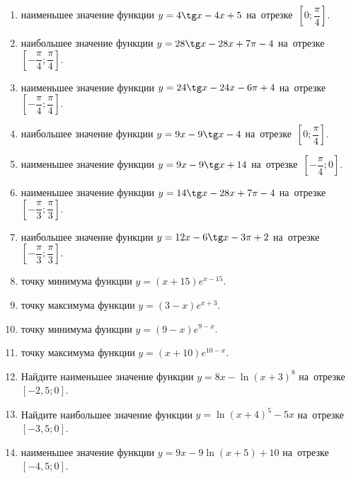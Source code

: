 \documentclass[a4paper,10pt]{article}
\begin{document}
\begin{enumerate}
\item {} наименьшее значение функции $y=4\tg x-4x+5$ на~отрезке~$\left[0;\dfrac{\pi }{4}\right]$.

\item {} наибольшее значение функции $y=28\tg x-28x+7\pi -4$ на~отрезке~$\left[-\dfrac{\pi }{4};\dfrac{\pi }{4}\right]$.

\item {} наименьшее значение функции $y=24\tg x-24x-6\pi +4$ на~отрезке~$\left[-\dfrac{\pi }{4};\dfrac{\pi }{4}\right]$.

\item {} наибольшее значение функции $y=9x-9\tg x-4$ на~отрезке~$\left[0;\dfrac{\pi }{4}\right]$.

\item {} наименьшее значение функции $y=9x-9\tg x+14$ на~отрезке~$\left[-\dfrac{\pi }{4};0\right]$.

\item {} наименьшее значение функции $y=14\tg x-28x+7\pi -4$ на~отрезке~$\left[-\dfrac{\pi }{3};\dfrac{\pi }{3}\right]$.

\item {} наибольшее значение функции $y=12x-6\tg x-3\pi +2$ на~отрезке~$\left[-\dfrac{\pi }{3};\dfrac{\pi }{3}\right]$.

\item {} точку минимума функции $y=\left(x+15\right)e^{x-15}$.

\item {} точку максимума функции $y=\left(3-x\right)e^{x+3}$.

\item {} точку минимума функции $y=\left(9-x\right)e^{9-x}$.

\item {} точку максимума функции $y=\left(x+10\right)e^{10-x}$.

\item Найдите наименьшее значение функции $y=8x-\ln \left(x+3\right)^8$ на~отрезке~$\left[-2,5;0\right]$.

\item Найдите наибольшее значение функции $y=\ln \left(x+4\right)^5-5x$ на~отрезке~$\left[-3,5;0\right]$.

\item {} наименьшее значение функции $y=9x-9\ln \left(x+5\right)+10$ на~отрезке~$\left[-4,5;0\right]$.


\end{enumerate}
\end{document}
